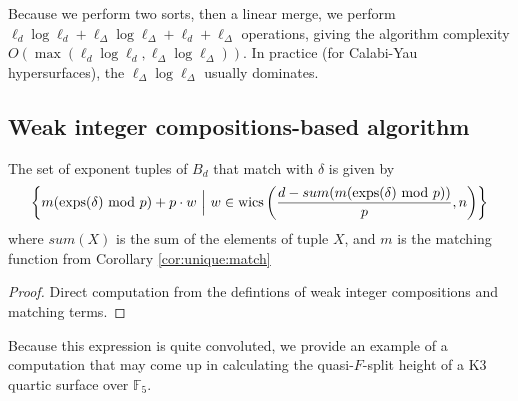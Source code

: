 Because we perform two sorts, then a linear merge, 
we perform 
$\ell_{d} \log \ell_{d} + \ell_{\Delta} \log \ell_{\Delta} + \ell_{d} + \ell_{\Delta}$ operations, 
giving the algorithm complexity 
$O(\max(\ell_{d} \log \ell_{d}, \ell_{\Delta} \log \ell_{\Delta}))$.
In practice (for Calabi-Yau hypersurfaces), 
the $\ell_{\Delta} \log \ell_{\Delta}$ usually dominates.

\subsection{Weak integer compositions-based algorithm}

\begin{lem}
    \label{lem:generate:matching}
    The set of exponent tuples of \(B_{d}\) that match with $\delta$ is given by 
    \[
        \left\{ m(\operatorname{exps}(\delta) \text{ mod } p) + p\cdot w ~\Big|~ w \in \operatorname{wics} 
        \left(\frac{d - sum(m(\operatorname{exps}(\delta) \text{ mod } p))}{p}, n \right) \right\}
    \]
    where $sum(X)$ is the sum of the elements of tuple $X$, and $m$ is the matching function from Corollary \ref{cor:unique:match}
\end{lem}

\begin{proof}
    Direct computation from the defintions of weak integer compositions and matching terms.
\end{proof}


Because this expression is quite convoluted, we 
provide an example of a computation 
that may come up in calculating the quasi-\(F\)-split 
height of a K3 quartic surface over $\mathbb{F}_5$.

